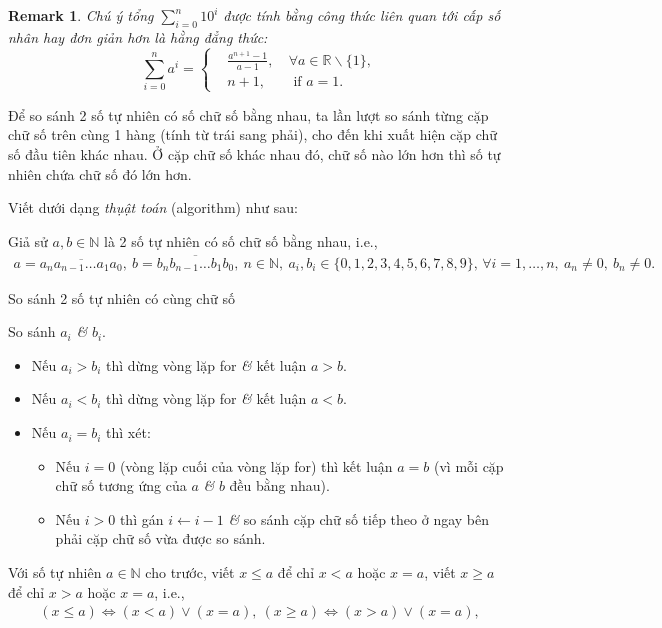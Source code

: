 \documentclass[oneside]{book}
\numberwithin{equation}{section}
\newtheorem{remark}{Remark}[section]
\begin{document}
\begin{remark}
	Chú ý tổng $\sum_{i=0}^n 10^i$ được tính bằng công thức liên quan tới \textit{cấp số nhân} hay đơn giản hơn là hằng đẳng thức:
	\begin{equation*}
		\sum_{i=0}^n a^i = \left\{\begin{split}
			&\frac{a^{n+1} - 1}{a - 1},\ &\forall a\in\mathbb{R}\backslash\{1\},\\
			&n + 1,&\mbox{ if } a = 1.
		\end{split}\right.
	\end{equation*}
\end{remark}

\begin{tcolorbox}
	Để so sánh 2 số tự nhiên có số chữ số bằng nhau, ta lần lượt so sánh từng cặp chữ số trên cùng 1 hàng (tính từ trái sang phải), cho đến khi xuất hiện cặp chữ số đầu tiên khác nhau. Ở cặp chữ số khác nhau đó, chữ số nào lớn hơn thì số tự nhiên chứa chữ số đó lớn hơn.
\end{tcolorbox}
Viết dưới dạng \textit{thụật toán} (algorithm) như sau:

Giả sử $a,b\in\mathbb{N}$ là 2 số tự nhiên có số chữ số bằng nhau, i.e.,
\begin{align*}
	a = \overline{a_na_{n-1}\ldots a_1a_0},\ b = \overline{b_nb_{n-1}\ldots b_1b_0},\ n\in\mathbb{N},\ a_i,b_i\in\{0,1,2,3,4,5,6,7,8,9\},\,\forall i = 1,\ldots,n,\ a_n\ne 0,\ b_n\ne 0.
\end{align*}

\begin{algorithm}
	\caption{So sánh 2 số tự nhiên có cùng chữ số}\label{alg:compare naturals with same digits}
	\begin{algorithmic}[1]
		 So sánh $a_i$ \textit{\&} $b_i$.
		\begin{itemize}
			\item Nếu $a_i > b_i$ thì dừng vòng lặp for \textit{\&} kết luận $a > b$.
			\item Nếu $a_i < b_i$ thì dừng vòng lặp for \textit{\&} kết luận $a < b$.
			\item Nếu $a_i = b_i$ thì xét:
			\begin{itemize}
				\item Nếu $i = 0$ (vòng lặp cuối của vòng lặp for) thì kết luận $a = b$ (vì mỗi cặp chữ số tương ứng của $a$ \textit{\&} $b$ đều bằng nhau).
				\item Nếu $i > 0$ thì gán $i\leftarrow i - 1$ \textit{\&} so sánh cặp chữ số tiếp theo ở ngay bên phải cặp chữ số vừa được so sánh.
			\end{itemize}			 
		\end{itemize}		
		\EndFor
	\end{algorithmic}
\end{algorithm}
Với số tự nhiên $a\in\mathbb{N}$ cho trước, viết $x\le a$ để chỉ $x < a$ hoặc $x = a$, viết $x\ge a$ để chỉ $x > a$ hoặc $x = a$, i.e.,
\begin{align*}
	(x\le a)\Leftrightarrow(x < a)\lor(x = a),\ (x\ge a)\Leftrightarrow(x > a)\lor(x = a),
\end{align*}
\end{document}
